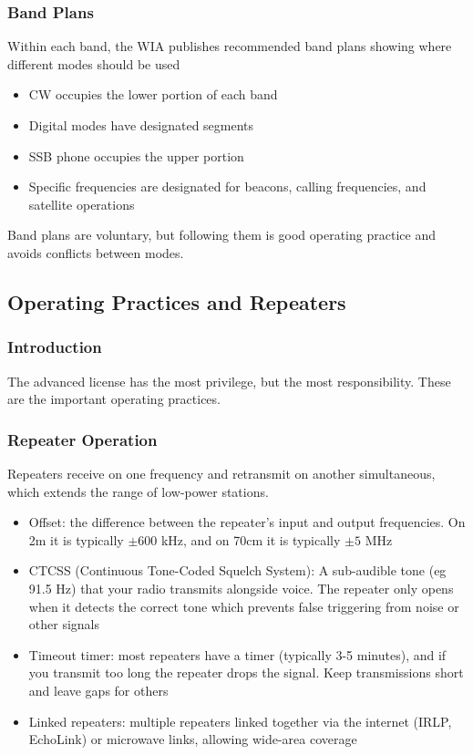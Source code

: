 \documentclass{article}
\begin{document}
\subsubsection{Band Plans}
Within each band, the WIA publishes recommended band plans showing where different modes should be used
\begin{itemize}
    \item CW occupies the lower portion of each band
    \item Digital modes have designated segments
    \item SSB phone occupies the upper portion
    \item Specific frequencies are designated for beacons, calling frequencies, and satellite operations
\end{itemize}
Band plans are voluntary, but following them is good operating practice and avoids conflicts between modes.

\subsection{Operating Practices and Repeaters}
\subsubsection{Introduction}
The advanced license has the most privilege, but the most responsibility. These are the important operating practices.

\subsubsection{Repeater Operation}
Repeaters receive on one frequency and retransmit on another simultaneous, which extends the range of low-power stations.
\begin{itemize}
    \item Offset: the difference between the repeater's input and output frequencies. On 2m it is typically $\pm 600$ kHz, and on 70cm it is typically $\pm 5$ MHz
    \item CTCSS (Continuous Tone-Coded Squelch System): A sub-audible tone (eg 91.5 Hz) that your radio transmits alongside voice. The repeater only opens when it detects the correct tone which prevents false triggering from noise or other signals
    \item Timeout timer: most repeaters have a timer (typically 3-5 minutes), and if you transmit too long the repeater drops the signal. Keep transmissions short and leave gaps for others
    \item Linked repeaters: multiple repeaters linked together via the internet (IRLP, EchoLink) or microwave links, allowing wide-area coverage
\end{itemize}
\end{document}
